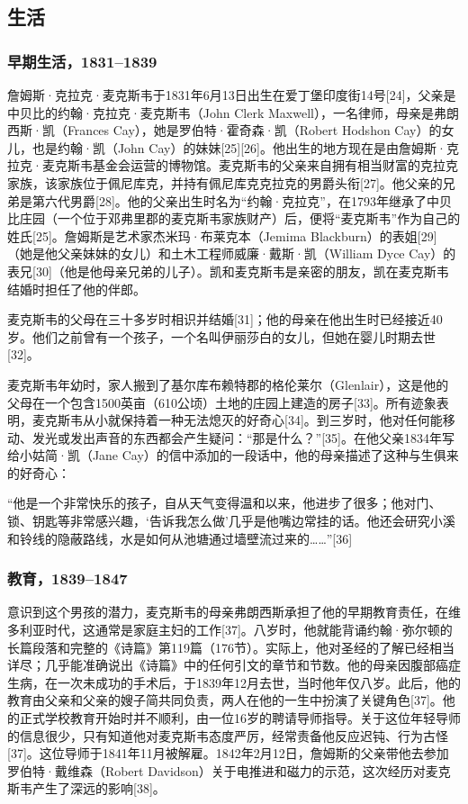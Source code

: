 \subsection{生活}  
\subsubsection{早期生活，1831–1839}
詹姆斯·克拉克·麦克斯韦于1831年6月13日出生在爱丁堡印度街14号[24]，父亲是中贝比的约翰·克拉克·麦克斯韦（John Clerk Maxwell），一名律师，母亲是弗朗西斯·凯（Frances Cay），她是罗伯特·霍奇森·凯（Robert Hodshon Cay）的女儿，也是约翰·凯（John Cay）的妹妹[25][26]。他出生的地方现在是由詹姆斯·克拉克·麦克斯韦基金会运营的博物馆。麦克斯韦的父亲来自拥有相当财富的克拉克家族，该家族位于佩尼库克，并持有佩尼库克克拉克的男爵头衔[27]。他父亲的兄弟是第六代男爵[28]。他的父亲出生时名为“约翰·克拉克”，在1793年继承了中贝比庄园（一个位于邓弗里郡的麦克斯韦家族财产）后，便将“麦克斯韦”作为自己的姓氏[25]。詹姆斯是艺术家杰米玛·布莱克本（Jemima Blackburn）的表姐[29]（她是他父亲妹妹的女儿）和土木工程师威廉·戴斯·凯（William Dyce Cay）的表兄[30]（他是他母亲兄弟的儿子）。凯和麦克斯韦是亲密的朋友，凯在麦克斯韦结婚时担任了他的伴郎。

麦克斯韦的父母在三十多岁时相识并结婚[31]；他的母亲在他出生时已经接近40岁。他们之前曾有一个孩子，一个名叫伊丽莎白的女儿，但她在婴儿时期去世[32]。

麦克斯韦年幼时，家人搬到了基尔库布赖特郡的格伦莱尔（Glenlair），这是他的父母在一个包含1500英亩（610公顷）土地的庄园上建造的房子[33]。所有迹象表明，麦克斯韦从小就保持着一种无法熄灭的好奇心[34]。到三岁时，他对任何能移动、发光或发出声音的东西都会产生疑问：“那是什么？”[35]。在他父亲1834年写给小姑简·凯（Jane Cay）的信中添加的一段话中，他的母亲描述了这种与生俱来的好奇心：

“他是一个非常快乐的孩子，自从天气变得温和以来，他进步了很多；他对门、锁、钥匙等非常感兴趣，‘告诉我怎么做’几乎是他嘴边常挂的话。他还会研究小溪和铃线的隐蔽路线，水是如何从池塘通过墙壁流过来的……”[36]
\subsubsection{教育，1839–1847}  
意识到这个男孩的潜力，麦克斯韦的母亲弗朗西斯承担了他的早期教育责任，在维多利亚时代，这通常是家庭主妇的工作[37]。八岁时，他就能背诵约翰·弥尔顿的长篇段落和完整的《诗篇》第119篇（176节）。实际上，他对圣经的了解已经相当详尽；几乎能准确说出《诗篇》中的任何引文的章节和节数。他的母亲因腹部癌症生病，在一次未成功的手术后，于1839年12月去世，当时他年仅八岁。此后，他的教育由父亲和父亲的嫂子简共同负责，两人在他的一生中扮演了关键角色[37]。他的正式学校教育开始时并不顺利，由一位16岁的聘请导师指导。关于这位年轻导师的信息很少，只有知道他对麦克斯韦态度严厉，经常责备他反应迟钝、行为古怪[37]。这位导师于1841年11月被解雇。1842年2月12日，詹姆斯的父亲带他去参加罗伯特·戴维森（Robert Davidson）关于电推进和磁力的示范，这次经历对麦克斯韦产生了深远的影响[38]。

